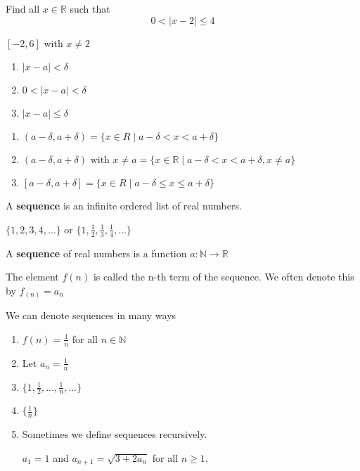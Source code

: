 
\begin{exmp}
Find all $x\in \mathbb{R}$ such that $$0<|x-2|\leq 4$$
\end{exmp} 

\begin{solution}
$[-2,6]$ with $x\neq 2$
\end{solution} 

\begin{enumerate}
\item $|x-a|<\delta$
\item $0<|x-a|<\delta$
\item $|x-a|\leq \delta$
\end{enumerate}

\begin{solution}

\begin{enumerate}
\item $(a-\delta, a+\delta) = \{x\in R \mid a-\delta < x < a+\delta \}$
\item $(a-\delta, a+\delta) \text{ with } x\neq a = \{x\in \mathbb{R} \mid a -\delta < x < a + \delta , x\neq a\}$
\item $[a-\delta, a+\delta] = \{x\in R \mid a-\delta \leq x \leq a+\delta \}$
\end{enumerate}
\end{solution}


\begin{defn}
A \textbf{sequence} is an infinite ordered list of real numbers.
\end{defn}

\begin{nota}
$\{1,2,3,4,\dots\}$ or  $\{1,\frac{1}{2},\frac{1}{3},\frac{1}{4},\dots\}$
\end{nota}


\begin{defn}
A \textbf{sequence} of real numbers is a function $a:\mathbb{N}\to\mathbb{R}$

The element $f(n)$ is called the n-th term of the sequence. We often denote this by $f_(n) = a_n$
\end{defn}


\begin{nota}
We can denote sequences in many ways
\begin{enumerate}
\item $f(n)=\frac{1}{n}$ for all $n\in \mathbb{N}$
\item Let $a_n = \frac{1}{n}$ 
\item $\{1,\frac{1}{2},\dots,\frac{1}{n},\dots\}$
\item $\{\frac{1}{n}\}$


\item Sometimes we define sequences recursively.

$a_1 = 1$ and $a_{n+1} = \sqrt{3+2a_n}$ for all $n\geq 1$.
\end{enumerate}
\end{nota}

